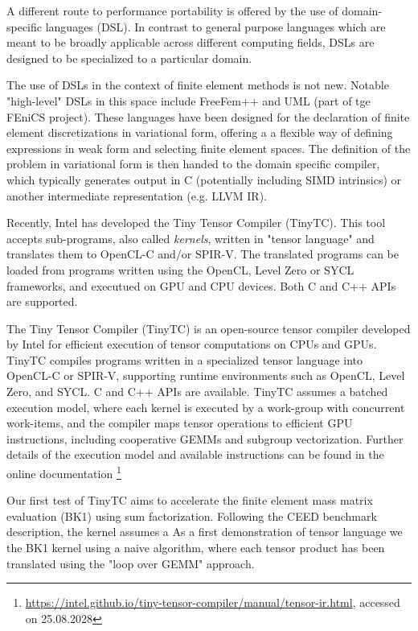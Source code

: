 \documentclass[a4paper,12pt]{article}
\begin{document}
\label{sec:tinytc}

A different route to performance portability is offered by the use of domain-specific languages (DSL). In contrast to general purpose languages which are meant to be broadly applicable across different computing fields, DSLs are designed to be specialized to a particular domain.

The use of DSLs in the context of finite element methods is not new.
Notable "high-level" DSLs in this space include FreeFem++ and UML (part of tge FEniCS project).
These languages have been designed for the declaration of finite element discretizations in variational form, offering a 
a flexible way of defining expressions in weak form and selecting finite element spaces. 
The definition of the problem in variational form is then handed to the domain specific compiler, which typically generates output in C (potentially including SIMD intrinsics) or another intermediate representation (e.g. LLVM IR). 

Recently, Intel has developed the Tiny Tensor Compiler (TinyTC).
This tool accepts sub-programs, also called \textit{kernels}, written in "tensor language" and translates them to OpenCL-C and/or SPIR-V. 
The translated programs can be loaded from programs written using the OpenCL, Level Zero or SYCL frameworks, 
and executued on GPU and CPU devices.
Both C and C++ APIs are supported.

The Tiny Tensor Compiler (TinyTC) is an open-source tensor compiler developed by Intel for efficient execution of tensor computations on CPUs and GPUs. TinyTC compiles programs written in a specialized tensor language into OpenCL-C or SPIR-V, supporting runtime environments such as OpenCL, Level Zero, and SYCL. C and C++ APIs are available. TinyTC assumes a batched execution model, where each kernel is executed by a work-group with concurrent work-items, and the compiler maps tensor operations to efficient GPU instructions, including cooperative GEMMs and subgroup vectorization. Further details of the execution model and available instructions can be found in the online documentation \footnote{\url{https://intel.github.io/tiny-tensor-compiler/manual/tensor-ir.html}, accessed on 25.08.2028}


Our first test of TinyTC aims to accelerate the finite element mass matrix evaluation (BK1) using sum factorization. Following the CEED benchmark description, the kernel assumes a  
As a first demonstration of tensor language we the BK1 kernel using a naive algorithm, where
each tensor product has been translated using the "loop over GEMM" approach. 
\end{document}
